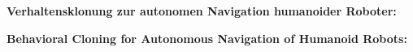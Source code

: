 \thispagestyle{empty}
\begin{center}
  \begin{minipage}[c][0.48\textheight][b]{0.9\textwidth}
    \small
    \textbf{
      Verhaltensklonung zur autonomen Navigation humanoider Roboter:
    }\par
    \vspace{\baselineskip}
    
  \end{minipage}\par
  \vfill
  \begin{minipage}[c][0.48\textheight][b]{0.9\textwidth}
    \small
    \textbf{
      Behavioral Cloning for Autonomous Navigation of Humanoid Robots:
    }\par
    \vspace{\baselineskip}
    
  \end{minipage}
\end{center}
